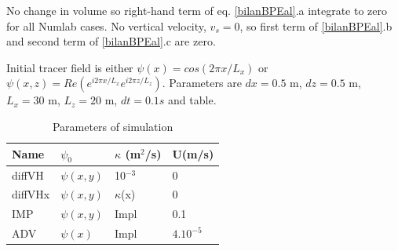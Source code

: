 No change in volume so right-hand term of eq. \ref{bilanBPEal}.a integrate to zero for all Numlab cases. No vertical velocity, $v_s=0$, so first term of \ref{bilanBPEal}.b and second term of \ref{bilanBPEal}.c are zero.

Initial tracer field is either $\psi(x)=cos(2\pi x/L_x)$ or $\psi(x,z)=Re(e^{i2\pi x/L_x}e^{i 2 \pi z/L_z})$. Parameters are $dx=0.5$ m, $dz=0.5$ m, $L_x=30$ m, $L_z=20$ m, $dt=0.1s$ and table.


\begin{table}[h!]
\centering
\begin{tabular}{|l|l|l|l|}
\hline
Name & $\psi_0$ & $\kappa$ (m$^2$/s)& U(m/s)\\
\hline
diffVH & $\psi(x,y)$ & 10$^{-3}$& 0\\
diffVHx & $\psi(x,y)$ & $\kappa$(x) & 0\\
IMP & $\psi(x,y)$ & Impl & 0.1\\
ADV & $\psi(x)$ & Impl & $4.10^{-5}$\\
\hline
\end{tabular}
\caption{Parameters of simulation}
\end{table}







